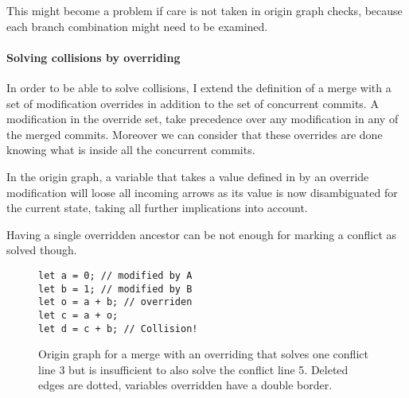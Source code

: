 \documentclass[a4paper,10pt]{article}
\begin{document}
This might become a problem if care is not taken in origin graph checks, because each branch combination might need to be examined.

\paragraph{Solving collisions by overriding}
In order to be able to solve collisions, I extend the definition of a merge with a set of modification overrides in addition to the set of concurrent commits.
A modification in the override set, take precedence over any modification in any of the merged commits. Moreover we can consider that these overrides are done knowing what is inside all the concurrent commits.

In the origin graph, a variable that takes a value defined in by an override modification will loose all incoming arrows as its value is now disambiguated for the current state, taking all further implications into account.

Having a single overridden ancestor can be not enough for marking a conflict as solved though.

\begin{figure}[ht]
\begin{minipage}{.5\textwidth}
\begin{lstlisting}
let a = 0; // modified by A
let b = 1; // modified by B
let o = a + b; // overriden
let c = a + o;
let d = c + b; // Collision!
\end{lstlisting}
\end{minipage}\hfill
\begin{minipage}{.45\textwidth}
\centering{}
\end{minipage}
\caption{Origin graph for a merge with an overriding that solves one conflict line 3 but is insufficient to also solve the conflict line 5. Deleted edges are dotted, variables overridden have a double border.}
\end{figure}
\end{document}
